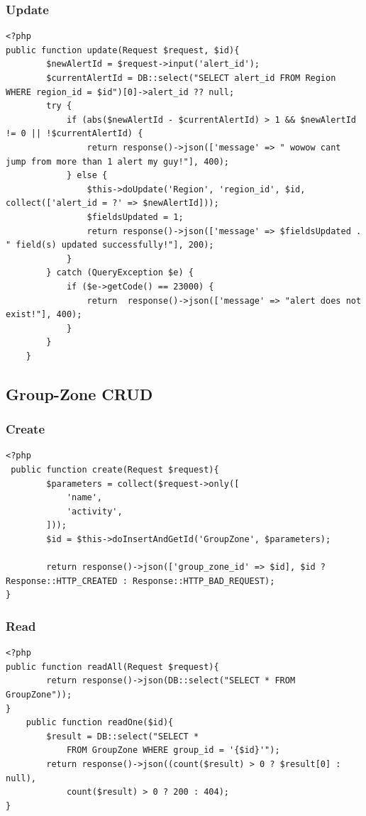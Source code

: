 \documentclass{article}
\begin{document}
\subsubsection{Update}
\begin{verbatim}
<?php
public function update(Request $request, $id){
        $newAlertId = $request->input('alert_id');
        $currentAlertId = DB::select("SELECT alert_id FROM Region WHERE region_id = $id")[0]->alert_id ?? null;
        try {
            if (abs($newAlertId - $currentAlertId) > 1 && $newAlertId != 0 || !$currentAlertId) {
                return response()->json(['message' => " wowow cant jump from more than 1 alert my guy!"], 400);
            } else {
                $this->doUpdate('Region', 'region_id', $id, collect(['alert_id = ?' => $newAlertId]));
                $fieldsUpdated = 1;
                return response()->json(['message' => $fieldsUpdated . " field(s) updated successfully!"], 200);
            }
        } catch (QueryException $e) {
            if ($e->getCode() == 23000) {
                return  response()->json(['message' => "alert does not exist!"], 400);
            }
        }
    }
\end{verbatim}

\subsection{Group-Zone CRUD}
\subsubsection{Create}
\begin{verbatim}
<?php
 public function create(Request $request){
        $parameters = collect($request->only([
            'name',
            'activity',
        ]));
        $id = $this->doInsertAndGetId('GroupZone', $parameters);

        return response()->json(['group_zone_id' => $id], $id ? Response::HTTP_CREATED : Response::HTTP_BAD_REQUEST);
}
\end{verbatim}
\subsubsection{Read}
\begin{verbatim}
<?php
public function readAll(Request $request){
        return response()->json(DB::select("SELECT * FROM GroupZone"));
}
    public function readOne($id){
        $result = DB::select("SELECT *
            FROM GroupZone WHERE group_id = '{$id}'");
        return response()->json((count($result) > 0 ? $result[0] : null),
            count($result) > 0 ? 200 : 404);
}

\end{verbatim}
\end{document}
